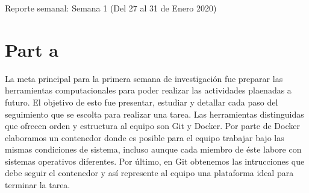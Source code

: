\documentclass{article}
\begin{document}
Reporte semanal: Semana 1 (Del 27 al 31 de Enero 2020)
\section*{Part a}
    La meta principal para la primera semana de investigación fue preparar las herramientas computacionales para poder realizar las actividades plaenadas a futuro. El objetivo de esto fue presentar, estudiar y detallar cada paso del seguimiento que se escolta para realizar una tarea. Las herramientas distinguidas que ofrecen orden y estructura al equipo son Git y Docker. Por parte de Docker elaboramos un contenedor donde es posible para el equipo trabajar bajo las mismas condiciones de sistema, incluso aunque cada miembro de éste labore con sistemas operativos diferentes. Por último, en Git obtenemos las intrucciones que debe seguir el contenedor y así represente al equipo una plataforma ideal para terminar la tarea.
\end{document}
